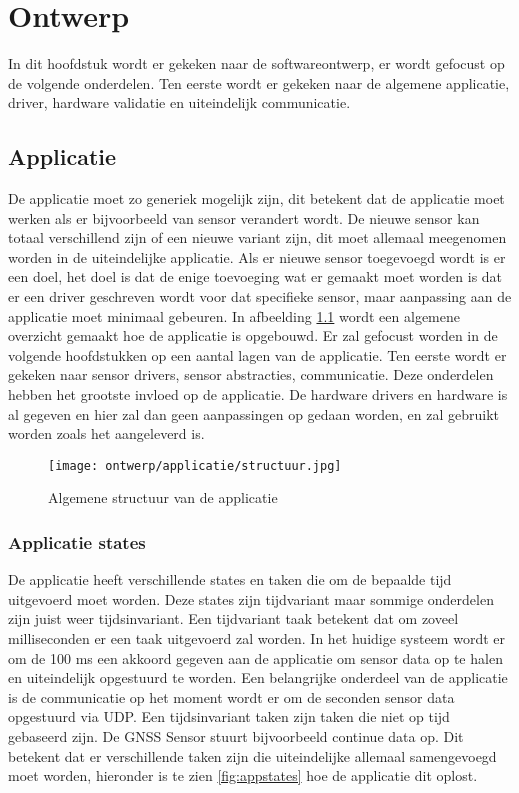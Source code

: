 \chapter{Ontwerp}
In dit hoofdstuk wordt er gekeken naar de softwareontwerp, er wordt gefocust op de volgende onderdelen. Ten eerste wordt er gekeken naar de algemene applicatie, driver, hardware validatie en uiteindelijk communicatie. 



\section{Applicatie}
De applicatie moet zo generiek mogelijk zijn, dit betekent dat de applicatie moet werken als er bijvoorbeeld van sensor verandert wordt. De nieuwe sensor kan totaal verschillend zijn of een nieuwe variant zijn, dit moet allemaal meegenomen worden in de uiteindelijke applicatie. Als er nieuwe sensor toegevoegd wordt is er een doel, het doel is dat de enige toevoeging wat er gemaakt moet worden is dat er een driver geschreven wordt voor dat specifieke sensor, maar aanpassing aan de applicatie moet minimaal gebeuren. In afbeelding \ref{fig:appontwerp} wordt een algemene overzicht gemaakt hoe de applicatie is opgebouwd. Er zal gefocust worden in de volgende hoofdstukken op een aantal lagen van de applicatie. Ten eerste wordt er gekeken naar sensor drivers, sensor abstracties, communicatie. Deze onderdelen hebben het grootste invloed op de applicatie. De hardware drivers en hardware is al gegeven en hier zal dan geen aanpassingen op gedaan worden, en zal gebruikt worden zoals het aangeleverd is.
\begin{figure}[h!]
	\centering
	\label{fig:appontwerp}
	\caption{Algemene structuur van de applicatie}
	\texttt{[image: ontwerp/applicatie/structuur.jpg]}
\end{figure}

\newpage
\subsection{Applicatie states}
De applicatie heeft verschillende states en taken die om de bepaalde tijd uitgevoerd moet worden. Deze states zijn tijdvariant maar sommige onderdelen zijn juist weer tijdsinvariant. Een tijdvariant taak  betekent dat om zoveel milliseconden er een taak uitgevoerd zal worden. In het huidige systeem wordt er om de 100 ms een akkoord gegeven aan de applicatie om sensor data op te halen en uiteindelijk opgestuurd te worden. Een belangrijke onderdeel van de applicatie is de communicatie op het moment wordt er om de seconden sensor data opgestuurd via UDP. Een tijdsinvariant taken zijn taken die niet op tijd gebaseerd zijn. De GNSS Sensor stuurt bijvoorbeeld continue data op. Dit betekent dat er verschillende taken zijn die uiteindelijke allemaal samengevoegd moet worden, hieronder is te zien \ref{fig:appstates} hoe de applicatie dit oplost.

